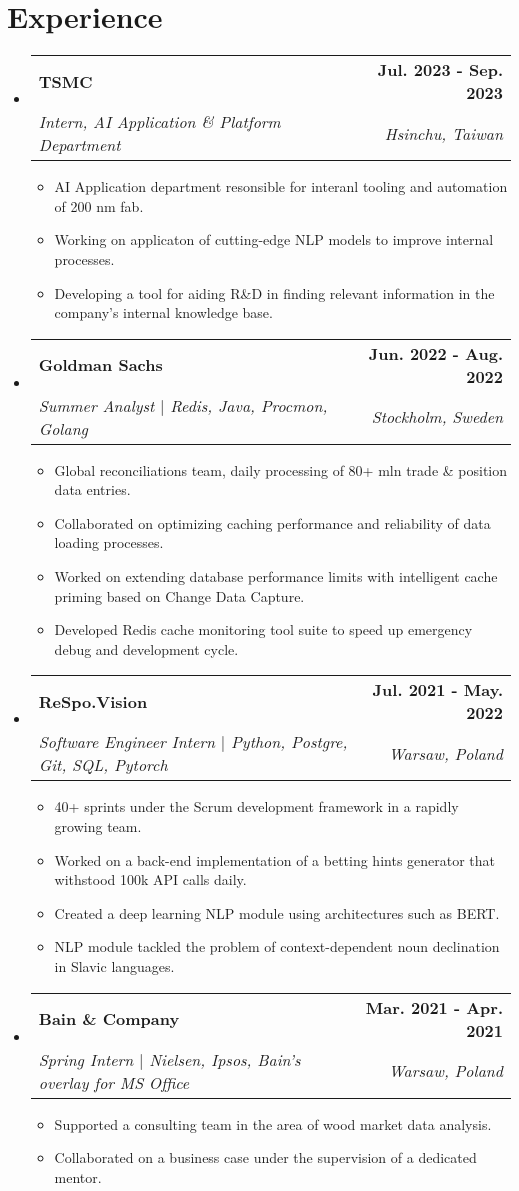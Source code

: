\documentclass[letterpaper,11pt]{article}
\makeatletter
\newcommand{\resumeItem}[1]{
  \item\small{
    {#1 \vspace{-2pt}}
  }
}
\newcommand{\resumeSubheading}[4]{
  \vspace{-2pt}\item
    \begin{tabular*}{1.0\textwidth}[t]{l@{\extracolsep{\fill}}r}
      \textbf{#1} & \textbf{\small #2} \\
      \textit{\small#3} & \textit{\small #4} \\
    \end{tabular*}\vspace{-7pt}
}
\newcommand{\resumeSubHeadingListStart}{\begin{itemize}[leftmargin=0.0in, label={}]}
\newcommand{\resumeSubHeadingListEnd}{\end{itemize}}
\newcommand{\resumeItemListStart}{\begin{itemize}}
\newcommand{\resumeItemListEnd}{\end{itemize}\vspace{-5pt}}
\makeatother
\begin{document}
\section{Experience}
\resumeSubHeadingListStart

\resumeSubheading
{TSMC}{Jul. 2023 - Sep. 2023}
{Intern, AI Application \& Platform Department}{Hsinchu, Taiwan}
\resumeItemListStart
\resumeItem{AI Application department resonsible for interanl tooling and automation of 200 nm fab.}
\resumeItem{Working on applicaton of cutting-edge NLP models to improve internal processes.}
\resumeItem{Developing a tool for aiding R\&D in finding relevant information in
  the company's internal knowledge base.}
\resumeItemListEnd

\resumeSubheading
{Goldman Sachs}{Jun. 2022 - Aug. 2022}
{Summer Analyst $|$ Redis, Java, Procmon, Golang }{Stockholm, Sweden}
\resumeItemListStart
\resumeItem{Global reconciliations team, daily processing of 80+ mln trade \& position data entries.}
\resumeItem{Collaborated on optimizing caching performance and reliability of data loading processes.}
\resumeItem{Worked on extending database performance limits with intelligent cache priming based on Change Data Capture.}
\resumeItem{Developed Redis cache monitoring tool suite to speed up emergency debug and development cycle.}
\resumeItemListEnd

\resumeSubheading
{ReSpo.Vision}{Jul. 2021 - May. 2022}
{Software Engineer Intern $|$  Python, Postgre, Git, SQL, Pytorch}{Warsaw, Poland}
\resumeItemListStart
\resumeItem{40+ sprints under the Scrum development framework in a rapidly growing team.}
\resumeItem{Worked on a back-end implementation of a betting hints generator that withstood 100k API calls daily.}
\resumeItem{Created a deep learning NLP module using architectures such as BERT.}
\resumeItem{NLP module tackled the problem of context-dependent noun declination in Slavic languages.}
\resumeItemListEnd

\resumeSubheading
{Bain \& Company}{Mar. 2021 - Apr. 2021}
{Spring Intern $|$ Nielsen, Ipsos, Bain's overlay for MS Office}{Warsaw, Poland}
\resumeItemListStart
\resumeItem{Supported a consulting team in the area of wood market data analysis.}
\resumeItem{Collaborated on a business case under the supervision of a dedicated mentor.}
\resumeItemListEnd

\resumeSubHeadingListEnd
\vspace{-16pt}

\end{document}
